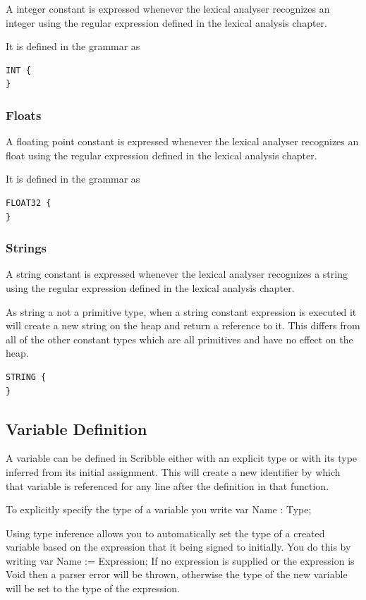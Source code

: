 \documentclass[]{final_report}
\begin{document}
A integer constant is expressed whenever the lexical analyser recognizes an integer using the regular expression defined in the lexical analysis chapter.

It is defined in the grammar as
\begin{verbatim}
INT {
}
\end{verbatim}

\subsubsection{Floats}

A floating point constant is expressed whenever the lexical analyser recognizes an float using the regular expression defined in the lexical analysis chapter.

It is defined in the grammar as
\begin{verbatim}
FLOAT32 {
}
\end{verbatim}

\subsubsection{Strings}

A string constant is expressed whenever the lexical analyser recognizes a string using the regular expression defined in the lexical analysis chapter.

As string a not a primitive type, when a string constant expression is executed it will create a new string on the heap and return a reference to it. This differs from all of the other constant types which are all primitives and have no effect on the heap.

\begin{verbatim}
STRING {
}
\end{verbatim}

\subsection{Variable Definition}

A variable can be defined in Scribble either with an explicit type or with its type inferred from its initial assignment. This will create a new identifier by which that variable is referenced for any line after the definition in that function.

To explicitly specify the type of a variable you write var Name : Type;

Using type inference allows you to automatically set the type of a created variable based on the expression that it being signed to initially. You do this by writing var Name := Expression; If no expression is supplied or the expression is Void then a parser error will be thrown, otherwise the type of the new variable will be set to the type of the expression.
\end{document}
